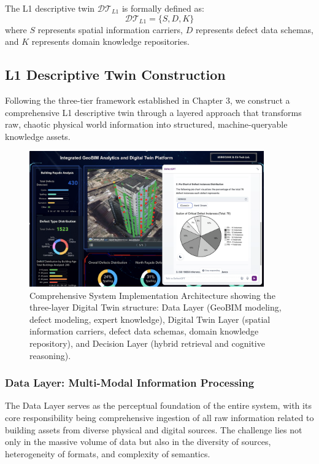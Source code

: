 The L1 descriptive twin $\mathcal{DT}_{L1}$ is formally defined as:
\begin{equation}
\mathcal{DT}_{L1} = \{S, D, K\}
\end{equation}
where $S$ represents spatial information carriers, $D$ represents defect data schemas, and $K$ represents domain knowledge repositories.

\subsection{L1 Descriptive Twin Construction}

Following the three-tier framework established in Chapter 3, we construct a comprehensive L1 descriptive twin through a layered approach that transforms raw, chaotic physical world information into structured, machine-queryable knowledge assets.

\begin{figure}[htbp]
\centering
\includegraphics[width=0.9\textwidth]{figures/DefectGPT/System_implement.png}
\caption{Comprehensive System Implementation Architecture showing the three-layer Digital Twin structure: Data Layer (GeoBIM modeling, defect modeling, expert knowledge), Digital Twin Layer (spatial information carriers, defect data schemas, domain knowledge repository), and Decision Layer (hybrid retrieval and cognitive reasoning).}
\label{fig:system-implementation}
\end{figure}

\subsubsection{Data Layer: Multi-Modal Information Processing}

The Data Layer serves as the perceptual foundation of the entire system, with its core responsibility being comprehensive ingestion of all raw information related to building assets from diverse physical and digital sources. The challenge lies not only in the massive volume of data but also in the diversity of sources, heterogeneity of formats, and complexity of semantics.

